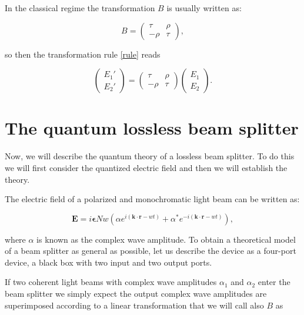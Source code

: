 \documentclass[12pt]{book}
\begin{document}
 In the classical regime the transformation $B$ is usually written as:
 
 \begin{equation}
 B=\begin{pmatrix} \tau & \rho \\ -\rho & \tau \end{pmatrix},
 \end{equation}


so then the transformation rule \ref{rule} reads

\begin{equation}
\begin{pmatrix} E_{1}' \\ E_{2}' \end{pmatrix}=\begin{pmatrix} \tau & \rho \\ -\rho & \tau \end{pmatrix} \begin{pmatrix} E_{1} \\ E_{2} \end{pmatrix}.
\end{equation}




\section{The quantum lossless beam splitter}

Now, we will describe the quantum theory of a lossless beam splitter. To do this we will first consider the quantized electric field and then we will establish the theory. 


The electric field of a polarized and monochromatic light beam can be written as:

\begin{equation}
\mathbf{E}=i \mathbf{\epsilon}N w \left( \alpha e^{i (\mathbf{k \cdot r}-w t)}+\alpha^{*} e^{-i (\mathbf{k \cdot r}-w t)} \right),
\end{equation}

where $\alpha$ is known as the complex wave amplitude. To obtain a theoretical model of a beam splitter as general as possible, let us describe the device as a four-port device, a black box with two input and two output ports.

If two coherent light beams with complex wave amplitudes $\alpha_{1}$ and $\alpha_{2}$ enter the beam splitter we simply expect the output complex wave amplitudes  are superimposed according to a linear transformation that we will call also $B$ as
\end{document}
